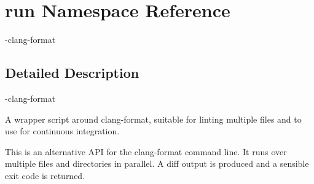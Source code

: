 \hypertarget{namespacerun}{}\section{run Namespace Reference}
\label{namespacerun}


-\/clang-\/format  




\subsection{Detailed Description}
-\/clang-\/format 

\begin{DoxyVerb}A wrapper script around clang-format, suitable for linting multiple files
and to use for continuous integration.

This is an alternative API for the clang-format command line.
It runs over multiple files and directories in parallel.
A diff output is produced and a sensible exit code is returned.\end{DoxyVerb}
 